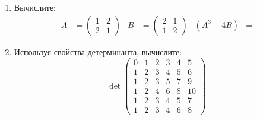 \begin{enumerate}
\item Вычислите:
\begin{align*}
    A &= \begin{pmatrix}1 & 2 \\2 & 1 \end{pmatrix} &
    B &= \begin{pmatrix}2 & 1 \\1 & 2 \end{pmatrix} &
    (A^3 -4B) &=
\end{align*}


\item Используя свойства детерминанта, вычислите:
\[
    \det 
    \begin{pmatrix}
    0 & 1 & 2 & 3 & 4 & 5 \\
    1 & 2 & 3 & 4 & 5 & 6 \\
    1 & 2 & 3 & 5 & 7 & 9 \\
    1 & 2 & 4 & 6 & 8 & 10 \\
    1 & 2 & 3 & 4 & 5 & 7 \\
    1 & 2 & 3 & 4 & 6 & 8
    \end{pmatrix}
\]


\end{enumerate}